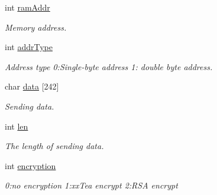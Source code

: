 \begin{DoxyCompactItemize}
\item 
\mbox{\label{struct_p_v_s_d_k___m_o_u_n_t_a_p_i___i2_c___d_a_t_a_afbdc6b4d781b344d498188ac4315bd3d}} 
int \hyperlink{struct_p_v_s_d_k___m_o_u_n_t_a_p_i___i2_c___d_a_t_a_afbdc6b4d781b344d498188ac4315bd3d}{ram\+Addr}
\begin{DoxyCompactList}\small\item\em Memory address. \end{DoxyCompactList}\item 
\mbox{\label{struct_p_v_s_d_k___m_o_u_n_t_a_p_i___i2_c___d_a_t_a_acb04b2a9182f37705ed8d1b5d0a14650}} 
int \hyperlink{struct_p_v_s_d_k___m_o_u_n_t_a_p_i___i2_c___d_a_t_a_acb04b2a9182f37705ed8d1b5d0a14650}{addr\+Type}
\begin{DoxyCompactList}\small\item\em Address type 0\+:Single-\/byte address 1\+: double byte address. \end{DoxyCompactList}\item 
\mbox{\label{struct_p_v_s_d_k___m_o_u_n_t_a_p_i___i2_c___d_a_t_a_a52b8f8fc42de1b508c4f1c2b254f7b1d}} 
char \hyperlink{struct_p_v_s_d_k___m_o_u_n_t_a_p_i___i2_c___d_a_t_a_a52b8f8fc42de1b508c4f1c2b254f7b1d}{data} \mbox{[}242\mbox{]}
\begin{DoxyCompactList}\small\item\em Sending data. \end{DoxyCompactList}\item 
\mbox{\label{struct_p_v_s_d_k___m_o_u_n_t_a_p_i___i2_c___d_a_t_a_a427fab0ebaaec826caf3a554dfc4f693}} 
int \hyperlink{struct_p_v_s_d_k___m_o_u_n_t_a_p_i___i2_c___d_a_t_a_a427fab0ebaaec826caf3a554dfc4f693}{len}
\begin{DoxyCompactList}\small\item\em The length of sending data. \end{DoxyCompactList}\item 
\mbox{\label{struct_p_v_s_d_k___m_o_u_n_t_a_p_i___i2_c___d_a_t_a_a4c19e771de15d007d9a4f0776989cada}} 
int \hyperlink{struct_p_v_s_d_k___m_o_u_n_t_a_p_i___i2_c___d_a_t_a_a4c19e771de15d007d9a4f0776989cada}{encryption}
\begin{DoxyCompactList}\small\item\em 0\+:no encryption 1\+:xx\+Tea encrypt 2\+:R\+SA encrypt \end{DoxyCompactList}\end{DoxyCompactItemize}


